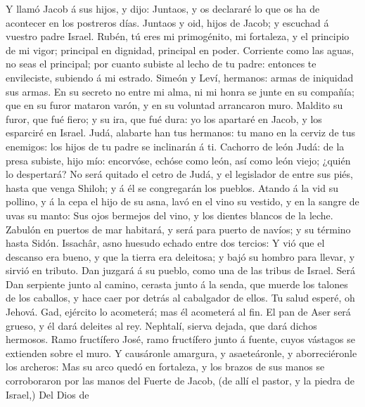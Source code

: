 Y llamó Jacob á sus hijos, y dijo: Juntaos, y os
declararé lo que os ha de acontecer en los postreros días.
 Juntaos y oid, hijos de Jacob; y escuchad á vuestro padre
Israel.  Rubén, tú eres mi primogénito, mi fortaleza, y el
principio de mi vigor; principal en dignidad, principal en poder.
 Corriente como las aguas, no seas el principal; por
cuanto subiste al lecho de tu padre: entonces te envileciste, subiendo á
mi estrado.  Simeón y Leví, hermanos: armas de iniquidad
sus armas.  En su secreto no entre mi alma, ni mi honra se
junte en su compañía; que en su furor mataron varón, y en su voluntad
arrancaron muro.  Maldito su furor, que fué fiero; y su
ira, que fué dura: yo los apartaré en Jacob, y los esparciré en Israel.
 Judá, alabarte han tus hermanos: tu mano en la cerviz de
tus enemigos: los hijos de tu padre se inclinarán á ti. 
Cachorro de león Judá: de la presa subiste, hijo mío: encorvóse, echóse
como león, así como león viejo; ¿quién lo despertará?  No
será quitado el cetro de Judá, y el legislador de entre sus piés, hasta
que venga Shiloh; y á él se congregarán los pueblos. 
Atando á la vid su pollino, y á la cepa el hijo de su asna, lavó en el
vino su vestido, y en la sangre de uvas su manto:  Sus
ojos bermejos del vino, y los dientes blancos de la leche.
 Zabulón en puertos de mar habitará, y será para puerto
de navíos; y su término hasta Sidón.  Issachâr, asno
huesudo echado entre dos tercios:  Y vió que el descanso
era bueno, y que la tierra era deleitosa; y bajó su hombro para llevar,
y sirvió en tributo.  Dan juzgará á su pueblo, como una
de las tribus de Israel.  Será Dan serpiente junto al
camino, cerasta junto á la senda, que muerde los talones de los
caballos, y hace caer por detrás al cabalgador de ellos. 
Tu salud esperé, oh Jehová.  Gad, ejército lo acometerá;
mas él acometerá al fin.  El pan de Aser será grueso, y
él dará deleites al rey.  Nephtalí, sierva dejada, que
dará dichos hermosos.  Ramo fructífero José, ramo
fructífero junto á fuente, cuyos vástagos se extienden sobre el muro.
 Y causáronle amargura, y asaeteáronle, y aborreciéronle
los archeros:  Mas su arco quedó en fortaleza, y los
brazos de sus manos se corroboraron por las manos del Fuerte de Jacob,
(de allí el pastor, y la piedra de Israel,)  Del Dios de
